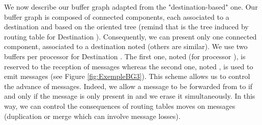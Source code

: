 \documentclass[11pt]{article}
\begin{document}
We now describe our buffer graph adapted from the "destination-based" one. Our buffer graph is composed of  connected components, each associated to a destination  and based on the oriented tree  (remind that  is the tree induced by routing table for Destination ). Consequently, we can present only one connected component, associated to a destination noted  (others are similar). We use two buffers per processor for Destination . The first one, noted  (for processor ), is reserved to the reception of messages whereas the second one, noted , is used to emit messages (see Figure \ref{fig:ExempleBG3}). This scheme allows us to control the advance of messages. Indeed, we allow a message to be forwarded from  to  if and only if the message is only present in  and we erase it simultaneously. In this way, we can control the consequences of routing tables moves on messages (duplication or merge which can involve message losses).
\end{document}
